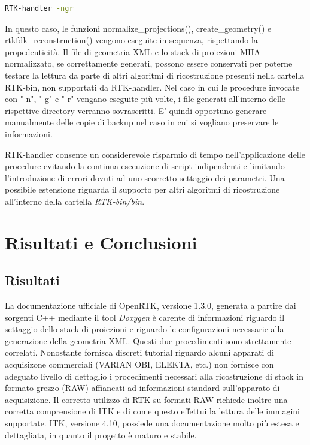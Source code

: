 \documentclass[a4paper,12pt, doubleside]{report}
\begin{document}
                \begin{lstlisting}[language=bash, frame=bt]
RTK-handler -ngr
                \end{lstlisting}
                
                In questo caso, le funzioni normalize\_projections(), create\_geometry() e rtkfdk\_reconstruction() vengono eseguite in sequenza, rispettando la propedeuticità. Il file di geometria XML e lo stack di proiezioni MHA normalizzato, se correttamente generati, possono essere conservati per poterne testare la lettura da parte di altri algoritmi di ricostruzione presenti nella cartella RTK-bin, non supportati da RTK-handler. Nel caso in cui le procedure invocate con "-n", "-g" e "-r" vengano eseguite più volte, i file generati all'interno delle rispettive directory verranno sovrascritti. E' quindi opportuno generare manualmente delle copie di backup nel caso in cui si vogliano preservare le informazioni.
                
            \bigskip
            \par
                RTK-handler consente un considerevole risparmio di tempo nell'applicazione delle procedure evitando la continua esecuzione di script indipendenti e limitando l'introduzione di errori dovuti ad uno scorretto settaggio dei parametri. Una possibile estensione riguarda il supporto per altri algoritmi di ricostruzione all'interno della cartella \textit{RTK-bin/bin}.
            
    \chapter{Risultati e Conclusioni}
        \section{Risultati}
            \par
                La documentazione ufficiale di OpenRTK, versione 1.3.0, generata a partire dai sorgenti C++ mediante il tool \textit{Doxygen} \cite{doxygen} è carente di informazioni riguardo il settaggio dello stack di proiezioni e riguardo le configurazioni necessarie alla generazione della geometria XML. Questi due procedimenti sono strettamente correlati. Nonostante fornisca discreti tutorial riguardo alcuni apparati di acquisizone commerciali (VARIAN OBI, ELEKTA, etc.) non fornisce con adeguato livello di dettaglio i procedimenti necessari alla ricostruzione di stack in formato grezzo (RAW) affiancati ad informazioni standard sull'apparato di acquisizione. Il corretto utilizzo di RTK su formati RAW richiede inoltre una corretta comprensione di ITK e di come questo effettui la lettura delle immagini supportate. ITK, versione 4.10, possiede una documentazione molto più estesa e dettagliata, in quanto il progetto è maturo e stabile. 
\end{document}
